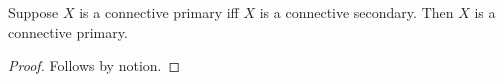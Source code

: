 

\begin{proposition}\label{horn_connective_unseeded}
    Suppose $X$ is a connective primary iff $X$ is a connective secondary.
    Then $X$ is a connective primary.
\end{proposition}
\begin{proof}
    Follows by notion.
\end{proof}
